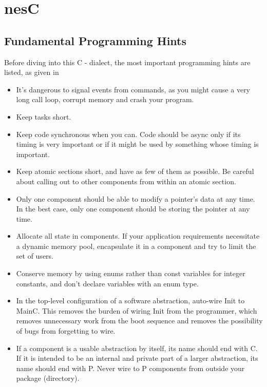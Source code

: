 
\chapter{nesC} \label{chapter:nesC}


\section{Fundamental Programming Hints}

Before diving into this C - dialect, the most important programming hints are listed, as given in ~\cite{prognesc:2006}

\begin{itemize}
 \item It's dangerous to signal events from commands, as you might cause a very long call loop, corrupt memory and crash your program.
 \item Keep tasks short.
 \item Keep code synchronous when you can. Code should be async only if its timing is very important or if it might be used by something whose timing is important.
 \item Keep atomic sections short, and have as few of them as possible. Be careful about calling out to other components from within an atomic section.
 \item Only one component should be able to modify a pointer's data at any time. In the best case, only one component should be storing the pointer at any time.
 \item Allocate all state in components. If your application requirements necessitate a dynamic memory pool, encapsulate it in a component and try to limit the set of users.
 \item Conserve memory by using enums rather than const variables for integer constants, and don't declare variables with an enum type.
 \item In the top-level configuration of a software abstraction, auto-wire Init to MainC. This removes the burden of wiring Init from the programmer, which removes unnecessary work from the boot sequence and removes the possibility of bugs from forgetting to wire.
 \item If a component is a usable abstraction by itself, its name should end with C. If it is intended to be an internal and private part of a larger abstraction, its name should end with P. Never wire to
P components from outside your package (directory).

\end{itemize}
